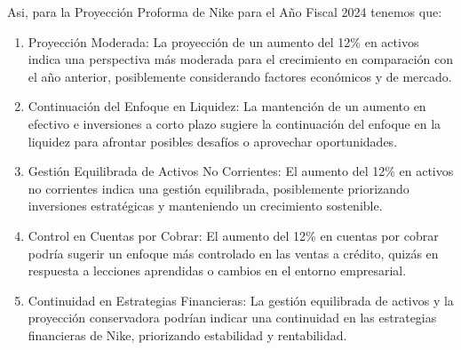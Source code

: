 \documentclass[a4paper,12pt]{article}
\begin{document}
Asi, para la Proyección Proforma de Nike para el Año Fiscal 2024 tenemos que:
    \begin{enumerate}
		\item Proyección Moderada: La proyección de un aumento del 12\% en activos indica una perspectiva más moderada para el crecimiento en comparación con el año anterior, posiblemente considerando factores económicos y de mercado.
		\item Continuación del Enfoque en Liquidez: La mantención de un aumento en efectivo e inversiones a corto plazo sugiere la continuación del enfoque en la liquidez para afrontar posibles desafíos o aprovechar oportunidades.
		\item Gestión Equilibrada de Activos No Corrientes: El aumento del 12\% en activos no corrientes indica una gestión equilibrada, posiblemente priorizando inversiones estratégicas y manteniendo un crecimiento sostenible.
		\item Control en Cuentas por Cobrar: El aumento del 12\% en cuentas por cobrar podría sugerir un enfoque más controlado en las ventas a crédito, quizás en respuesta a lecciones aprendidas o cambios en el entorno empresarial.
		\item Continuidad en Estrategias Financieras: La gestión equilibrada de activos y la proyección conservadora podrían indicar una continuidad en las estrategias financieras de Nike, priorizando estabilidad y rentabilidad.
	 \end{enumerate}
\end{document}
